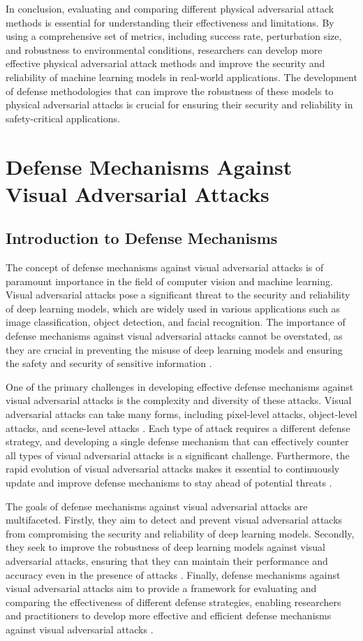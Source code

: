 \documentclass[11pt]{article}
\begin{document}
In conclusion, evaluating and comparing different physical adversarial attack methods is essential for understanding their effectiveness and limitations. By using a comprehensive set of metrics, including success rate, perturbation size, and robustness to environmental conditions, researchers can develop more effective physical adversarial attack methods and improve the security and reliability of machine learning models in real-world applications. The development of defense methodologies that can improve the robustness of these models to physical adversarial attacks is crucial for ensuring their security and reliability in safety-critical applications.

\section{Defense Mechanisms Against Visual Adversarial Attacks}

\subsection{Introduction to Defense Mechanisms}

The concept of defense mechanisms against visual adversarial attacks is of paramount importance in the field of computer vision and machine learning. Visual adversarial attacks pose a significant threat to the security and reliability of deep learning models, which are widely used in various applications such as image classification, object detection, and facial recognition. The importance of defense mechanisms against visual adversarial attacks cannot be overstated, as they are crucial in preventing the misuse of deep learning models and ensuring the safety and security of sensitive information \cite{ref101}.

One of the primary challenges in developing effective defense mechanisms against visual adversarial attacks is the complexity and diversity of these attacks. Visual adversarial attacks can take many forms, including pixel-level attacks, object-level attacks, and scene-level attacks \cite{ref102}. Each type of attack requires a different defense strategy, and developing a single defense mechanism that can effectively counter all types of visual adversarial attacks is a significant challenge. Furthermore, the rapid evolution of visual adversarial attacks makes it essential to continuously update and improve defense mechanisms to stay ahead of potential threats \cite{ref103}.

The goals of defense mechanisms against visual adversarial attacks are multifaceted. Firstly, they aim to detect and prevent visual adversarial attacks from compromising the security and reliability of deep learning models. Secondly, they seek to improve the robustness of deep learning models against visual adversarial attacks, ensuring that they can maintain their performance and accuracy even in the presence of attacks \cite{ref104}. Finally, defense mechanisms against visual adversarial attacks aim to provide a framework for evaluating and comparing the effectiveness of different defense strategies, enabling researchers and practitioners to develop more effective and efficient defense mechanisms against visual adversarial attacks \cite{ref105}.
\end{document}
